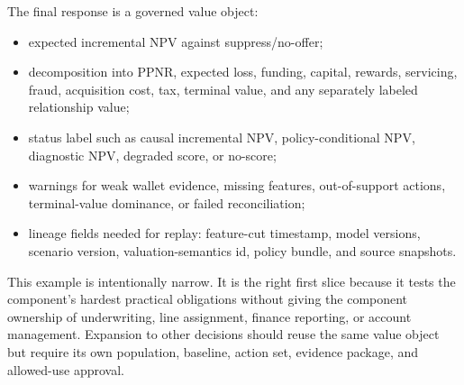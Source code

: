 \documentclass[11pt]{article}
\newcommand{\1}{\mathbf{1}}
\begin{document}
The final response is a governed value object:
\begin{itemize}[leftmargin=*]
  \item expected incremental NPV against suppress/no-offer;
  \item decomposition into PPNR, expected loss, funding, capital, rewards,
        servicing, fraud, acquisition cost, tax, terminal value, and any
        separately labeled relationship value;
  \item status label such as causal incremental NPV, policy-conditional NPV,
        diagnostic NPV, degraded score, or no-score;
  \item warnings for weak wallet evidence, missing features, out-of-support
        actions, terminal-value dominance, or failed reconciliation;
  \item lineage fields needed for replay: feature-cut timestamp, model
        versions, scenario version, valuation-semantics id, policy bundle, and
        source snapshots.
\end{itemize}

This example is intentionally narrow. It is the right first slice because it
tests the component's hardest practical obligations without giving the
component ownership of underwriting, line assignment, finance reporting, or
account management. Expansion to other decisions should reuse the same value
object but require its own population, baseline, action set, evidence package,
and allowed-use approval.
\end{document}
